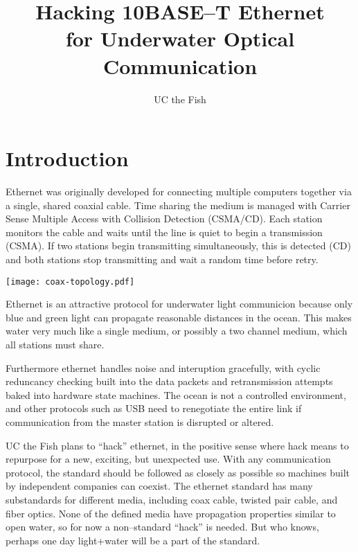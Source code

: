 \documentclass{article}
\begin{document}
\title{Hacking 10BASE--T Ethernet\\for Underwater Optical Communication}
\author{UC the Fish}

\maketitle

\section{Introduction}

Ethernet was originally developed for connecting multiple computers together
via a single, shared coaxial cable.
Time sharing the medium is managed with Carrier Sense Multiple Access with
Collision Detection (CSMA/CD). Each station monitors the cable
and waits until the line is quiet to begin a transmission (CSMA).
If two stations begin transmitting simultaneously, this is detected
(CD) and both stations stop transmitting and wait a random time
before retry.

\begin{center}
	\texttt{[image: coax-topology.pdf]}
\end{center}

Ethernet is an attractive protocol for underwater light communicion
because only blue and green light can propagate reasonable distances
in the ocean.
This makes water very much like a single medium, or possibly a
two channel medium, which all stations must share.

Furthermore ethernet handles noise and interuption gracefully,
with cyclic reduncancy checking built into the data packets
and retransmission attempts baked into hardware state machines.
The ocean is not a controlled environment, and other protocols
such as USB need to renegotiate the entire link if communication
from the master station is disrupted or altered.

UC the Fish plans to ``hack'' ethernet, in the positive sense where hack
means to repurpose for a new, exciting, but unexpected use.
With any communication protocol, the standard should be followed as closely
as possible so machines built by independent companies can coexist.
The ethernet standard has many substandards for different media,
including coax cable, twisted pair cable, and fiber optics.
None of the defined media have propagation properties similar to open water,
so for now a non--standard ``hack'' is needed.
But who knows, perhaps one day light+water will be a part of the standard.
\end{document}
